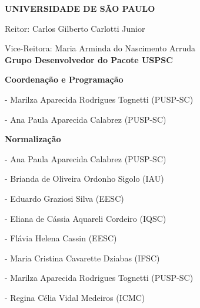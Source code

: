 
\textbf{UNIVERSIDADE DE SÃO PAULO} 

Reitor: Carlos Gilberto Carlotti Junior

Vice-Reitora: Maria Arminda do Nascimento Arruda\\

\textbf{Grupo Desenvolvedor do Pacote USPSC} 

\textbf{Coordenação e Programação}

- Marilza Aparecida Rodrigues Tognetti (PUSP-SC)
	
- Ana Paula Aparecida Calabrez (PUSP-SC) 

\textbf{Normalização}

- Ana Paula Aparecida Calabrez (PUSP-SC) 

- Brianda de Oliveira Ordonho Sigolo (IAU)

- Eduardo Graziosi Silva (EESC)

- Eliana de Cássia Aquareli Cordeiro (IQSC)

- Flávia Helena Cassin (EESC)

- Maria Cristina Cavarette Dziabas (IFSC)

- Marilza Aparecida Rodrigues Tognetti (PUSP-SC)

- Regina Célia Vidal Medeiros (ICMC) \\


